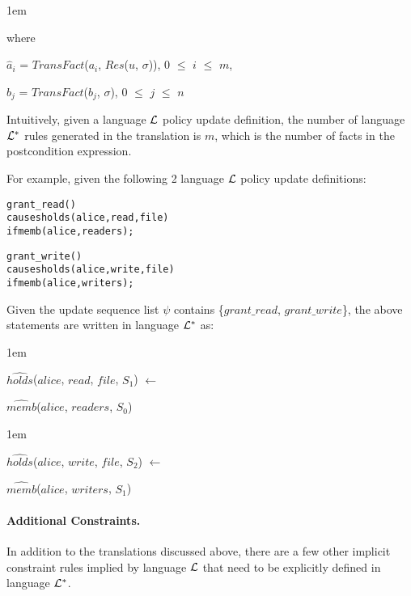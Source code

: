 \documentclass[global,twocolumn,final]{svjour}
\newenvironment{vquote}
  {\begin{list}{}{\leftmargin 1em}\item[]}
  {\end{list}}
\newenvironment{vverbatim}
  {\begin{alltt}}
  {\vspace{-\baselineskip}\end{alltt}}
\begin{document}
          \begin{vquote}
            where

            $\hat{a}_{i}$ = $TransFact$($a_{i}$, $Res$($u$, $\sigma$)),
            $0$ $\leq$ $i$ $\leq$ $m$,

            $\hat{b}_{j}$ = $TransFact$($b_{j}$, $\sigma$),
            $0$ $\leq$ $j$ $\leq$ $n$
          \end{vquote}

          Intuitively, given a language ${\cal L}$ policy update definition,
          the number of language ${\cal L}^{*}$ rules generated in the
          translation is $m$, which is the number of facts in the
          postcondition expression.

          For example, given the following 2 language ${\cal L}$ policy update
          definitions:

          \begin{vverbatim}
  grant\_read()
    causes holds(alice, read, file)
    if memb(alice, readers);

  grant\_write()
    causes holds(alice, write, file)
    if memb(alice, writers);
          \end{vverbatim}

          Given the update sequence list $\psi$ contains
          \{$grant\_read$, $grant\_write$\}, the above statements are written
          in language ${\cal L}^{*}$ as:

          \begin{vquote}
            $\hat{holds}$($alice$, $read$, $file$, $S_{1}$) $\leftarrow$

            \hspace{1em}
            $\hat{memb}$($alice$, $readers$, $S_{0}$)
          \end{vquote}

          \begin{vquote}
            $\hat{holds}$($alice$, $write$, $file$, $S_{2}$) $\leftarrow$

            \hspace{1em}
            $\hat{memb}$($alice$, $writers$, $S_{1}$)
          \end{vquote}

        \paragraph{Additional Constraints.}

          In addition to the translations discussed above, there are a few
          other implicit constraint rules implied by language ${\cal L}$
          that need to be explicitly defined in language ${\cal L}^{*}$.
\end{document}
